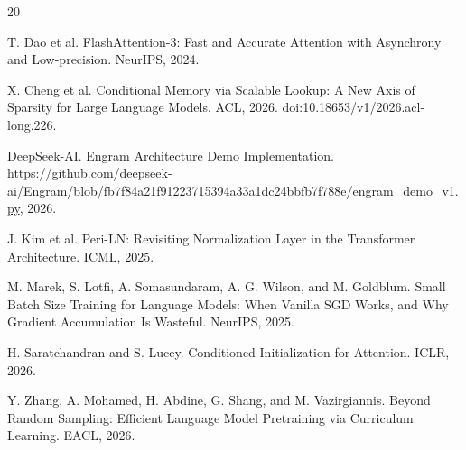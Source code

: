 \documentclass{article}
\begin{document}
\clearpage
{\footnotesize
\begin{thebibliography}{20}

T. Dao et al. FlashAttention-3: Fast and Accurate Attention with
Asynchrony and Low-precision. NeurIPS, 2024.

X. Cheng et al. Conditional Memory via Scalable Lookup: A New Axis of Sparsity
for Large Language Models. ACL, 2026. doi:10.18653/v1/2026.acl-long.226.

DeepSeek-AI. Engram Architecture Demo Implementation.
\url{https://github.com/deepseek-ai/Engram/blob/fb7f84a21f91223715394a33a1dc24bbfb7f788e/engram_demo_v1.py}, 2026.

J. Kim et al. Peri-LN: Revisiting Normalization Layer in the Transformer
Architecture. ICML, 2025.

M. Marek, S. Lotfi, A. Somasundaram, A. G. Wilson, and M. Goldblum.
Small Batch Size Training for Language Models: When Vanilla SGD Works, and
Why Gradient Accumulation Is Wasteful. NeurIPS, 2025.

H. Saratchandran and S. Lucey. Conditioned Initialization for Attention.
ICLR, 2026.

Y. Zhang, A. Mohamed, H. Abdine, G. Shang, and M. Vazirgiannis.
Beyond Random Sampling: Efficient Language Model Pretraining via Curriculum
Learning. EACL, 2026.

\end{thebibliography}
}
\end{document}
